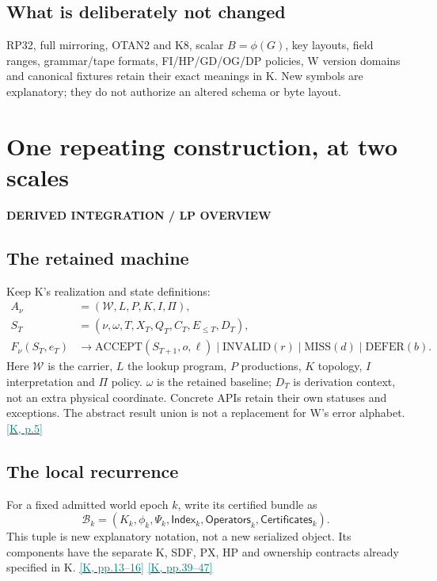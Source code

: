 \documentclass[11pt,a4paper]{article}
\newcommand{\kref}[1]{\hyperlink{baseline.#1}{\textcolor{teal}{[K, p.#1]}}}
\newcommand{\krange}[2]{\hyperlink{baseline.#1}{\textcolor{teal}{[K, pp.#1--#2]}}}
\newcommand{\status}[1]{{\sffamily\bfseries\scriptsize\color{teal}#1}\par}
\newcommand{\sectionstart}[1]{\par\addvspace{18pt}\Needspace{12\baselineskip}\section{#1}}
\theoremstyle{lpstyle}
\begin{document}
\subsection{What is deliberately not changed}
RP32, full mirroring, OTAN2 and K8, scalar $B=\phi(G)$, key layouts, field ranges, grammar/tape formats, FI/HP/GD/OG/DP policies, W version domains and canonical fixtures retain their exact meanings in K. New symbols are explanatory; they do not authorize an altered schema or byte layout.

\sectionstart{One repeating construction, at two scales}
\status{DERIVED INTEGRATION / LP OVERVIEW}
\subsection{The retained machine}
Keep K's realization and state definitions:
\begin{align*}
A_\nu &= (\mathcal W,L,P,K,I,\Pi),\\
S_T &= (\nu,\omega,T,X_T,Q_T,C_T,E_{\le T},D_T),\\
F_\nu(S_T,e_T)&\longrightarrow
\mathrm{ACCEPT}(S_{T+1},o,\ell)\;|\;\mathrm{INVALID}(r)\;|\;\mathrm{MISS}(d)\;|\;\mathrm{DEFER}(b).
\end{align*}
Here $\mathcal W$ is the carrier, $L$ the lookup program, $P$ productions, $K$ topology, $I$ interpretation and $\Pi$ policy. $\omega$ is the retained baseline; $D_T$ is derivation context, not an extra physical coordinate. Concrete APIs retain their own statuses and exceptions. The abstract result union is not a replacement for W's error alphabet. \kref{5}

\subsection{The local recurrence}
For a fixed admitted world epoch $k$, write its certified bundle as
\[
\mathcal B_k=(K_k,\phi_k,\Psi_k,\mathsf{Index}_k,\mathsf{Operators}_k,\mathsf{Certificates}_k).
\]
This tuple is new explanatory notation, not a new serialized object. Its components have the separate K, SDF, PX, HP and ownership contracts already specified in K. \krange{13}{16} \krange{39}{47}
\end{document}

